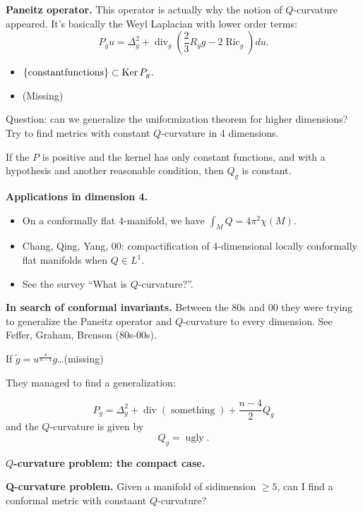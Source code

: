 \medskip\noindent
{\bf Paneitz operator.}
This operator is actually why the notion of
$Q$-curvature appeared. It's basically the
Weyl Laplacian with lower order terms:
$$
P_gu= \Delta_g^2 + \operatorname{div}_g
\left(\frac{2}{3}R_g g - 2
\operatorname{Ric}_g\right)du.
$$

\begin{itemize}
\item $\{\operatorname{constant
functions}\}\subset \mathop{\mathrm{Ker}} P_g$.
\item (Missing)
\end{itemize}

\noindent
Question: can we generalize the
uniformization theorem for higher
dimensions? Try to find metrics with
constant $Q$-curvature in 4 dimensions.

\begin{theorem}
\label{theorem-ggy}
If the $P$ is positive and the kernel
has only constant functions, and with a
hypothesis and another reasonable condition,
then $Q_g$ is constant.
\end{theorem}

\medskip\noindent
{\bf Applications in dimension 4.}
\begin{itemize}
\item On a conformally flat 4-manifold,
we have $\int_M Q= 4\pi^2\chi (M)$.
\item Chang, Qing, Yang, 00:
compactification of 4-dimensional locally
conformally flat manifolds when $Q \in L^1$.
\item See the survey ``What is
$Q$-curvature?''.
\end{itemize}

\medskip\noindent
{\bf In search of conformal invariants.}
Between the 80s and 00 they were trying to
generalize the Paneitz operator and
$Q$-curvature to every dimension. See
Feffer, Graham, Brenson (80s-00s).

If $\tilde{g} =
u^{\frac{4}{n-4}}g$…(missing)

They managed to find a generalization:

$$
P_g = \Delta_g^2 + \operatorname{div}
\left(\operatorname{something}\right)
+ \frac{n-4}{2}Q_g
$$
and the $Q$-curvature is given by
$$
Q_g=\operatorname{ugly}.
$$

\medskip\noindent
{\bf $Q$-curvature problem: the compact
case.}

\noindent
{\bf Q-curvature problem.} Given a manifold
of sidimension $\geq 5$, can I find a
conformal metric with constaant
$Q$-curvature?

